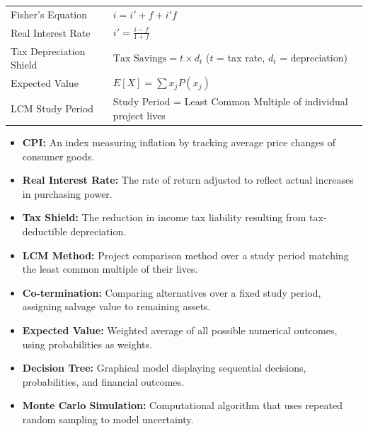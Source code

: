 \documentclass[12pt,a4paper]{article}
\renewcommand{\arraystretch}{1.45}
\begin{document}
\begin{tcolorbox}[formulabox, title={\textbf{Key Formulas at a Glance}}]
\renewcommand{\arraystretch}{1.3}
\begin{tabularx}{\linewidth}{B{3.8cm} X}
Fisher's Equation       & $i = i' + f + i'f$ \\[4pt]
Real Interest Rate      & $i' = \displaystyle\frac{i - f}{1 + f}$ \\[6pt]
Tax Depreciation Shield & $\text{Tax Savings} = t \times d_t$ \quad ($t$ = tax rate, $d_t$ = depreciation) \\[4pt]
Expected Value          & $E[X] = \displaystyle\sum x_j P(x_j)$ \\[6pt]
LCM Study Period        & Study Period = Least Common Multiple of individual project lives
\end{tabularx}
\end{tcolorbox}

\begin{tcolorbox}[defbox, title={\textbf{One-Line Definitions}}]
\begin{itemize}[leftmargin=*, itemsep=2pt, topsep=0pt]
  \item \textbf{CPI:} An index measuring inflation by tracking average price changes of consumer goods.
  \item \textbf{Real Interest Rate:} The rate of return adjusted to reflect actual increases in purchasing power.
  \item \textbf{Tax Shield:} The reduction in income tax liability resulting from tax-deductible depreciation.
  \item \textbf{LCM Method:} Project comparison method over a study period matching the least common multiple of their lives.
  \item \textbf{Co-termination:} Comparing alternatives over a fixed study period, assigning salvage value to remaining assets.
  \item \textbf{Expected Value:} Weighted average of all possible numerical outcomes, using probabilities as weights.
  \item \textbf{Decision Tree:} Graphical model displaying sequential decisions, probabilities, and financial outcomes.
  \item \textbf{Monte Carlo Simulation:} Computational algorithm that uses repeated random sampling to model uncertainty.
\end{itemize}
\end{tcolorbox}
\end{document}
